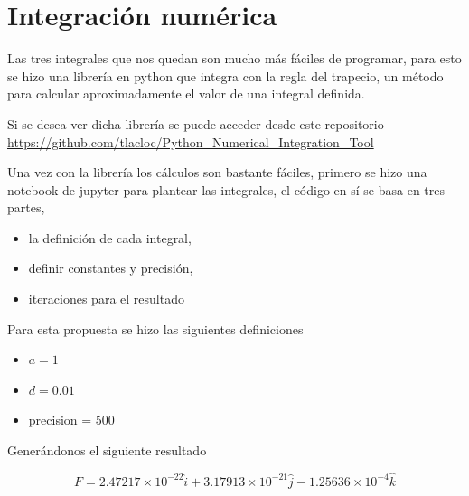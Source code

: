 \documentclass[11pt]{report}
\theoremstyle{plain}
\theoremstyle{definition}
\begin{document}
	\section*{Integración numérica}
	
	Las tres integrales que nos quedan son mucho más fáciles de programar, para esto se hizo una librería en python que integra con la regla del trapecio, un método para calcular aproximadamente el valor de una integral definida.
	
	Si se desea ver dicha librería se puede acceder desde este repositorio \url{https://github.com/tlacloc/Python_Numerical_Integration_Tool}
	
	Una vez con la librería los cálculos son bastante fáciles, primero se hizo una notebook de jupyter para plantear las integrales, el código en sí se basa en tres partes, 
	\begin{itemize}
		\item la definición de cada integral,
		\item definir constantes y precisión,
		\item iteraciones para el resultado
	\end{itemize}  

	
	Para esta propuesta se hizo las siguientes definiciones
	\begin{itemize}
		\item $a = 1$
		\item $d = 0.01$
		\item precision = 500
	\end{itemize}
	
	
	Generándonos el siguiente resultado
	
	\begin{equation*}
		F = 2.47217\times 10^{-22}\hat{i} + 3.17913\times 10^{-21}\hat{j} - 1.25636\times 10^{-4}\hat{k}
	\end{equation*}

\end{document}
